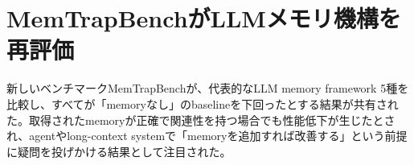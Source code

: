\section{MemTrapBenchがLLMメモリ機構を再評価}
新しいベンチマークMemTrapBenchが、代表的なLLM memory framework 5種を比較し、すべてが「memoryなし」のbaselineを下回ったとする結果が共有された。取得されたmemoryが正確で関連性を持つ場合でも性能低下が生じたとされ、agentやlong-context systemで「memoryを追加すれば改善する」という前提に疑問を投げかける結果として注目された。
